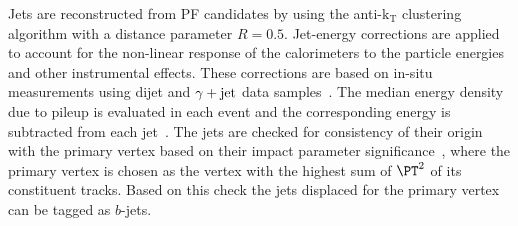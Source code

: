 Jets are reconstructed from PF candidates by using the
anti-$\mathrm{k_{T}}$ clustering algorithm
\cite{Cacciari:2008gp,fastjetmanual} with a distance parameter 
$R = 0.5$. 
Jet-energy corrections are applied to account for the non-linear
response of the calorimeters to the particle energies and other
instrumental effects.  These corrections are based on in-situ
measurements using dijet and $\gamma+{\rm jet}$ data
samples~\cite{Chatrchyan:2011ds}.  
The median energy density due to pileup
is evaluated in each event and the corresponding energy is subtracted
from each jet~\cite{Cacciari:2008gn}.  
The jets are checked for consistency 
of their origin with the primary vertex based on their impact parameter
significance~\cite{CMS-PAS-BTV-11-003}, where
the
primary vertex is chosen as the vertex with the highest sum of $\PT^2$
of its constituent tracks. 
Based on this check the jets displaced for the primary 
vertex can be tagged as $b$-jets.


